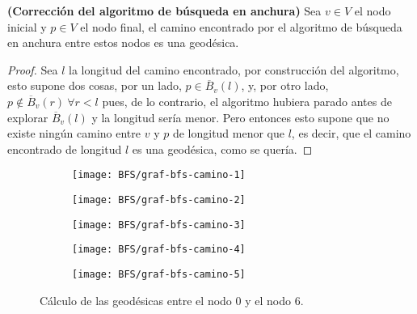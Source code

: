 \begin{proposicion}\label{prop:BFS}
	\textbf{(Corrección del algoritmo de búsqueda en anchura)} Sea $v \in V$ el nodo inicial y $p \in V$ el nodo final, el camino encontrado por el algoritmo de búsqueda en anchura entre estos nodos es una geodésica.
\end{proposicion}

\begin{proof}
	Sea $l$ la longitud del camino encontrado, por construcción del algoritmo, esto supone dos cosas, por un lado, $p \in \overline B_v(l)$, y, por otro lado, $p \notin \overline B_v(r)\ \forall r<l$ pues, de lo contrario, el algoritmo hubiera parado antes de explorar $\overline B_v(l)$ y la longitud sería menor. Pero entonces esto supone que no existe ningún camino entre $v$ y $p$ de longitud menor que $l$, es decir, que el camino encontrado de longitud $l$ es una geodésica, como se quería.
\end{proof}


\begin{figure}[htb]
	\centering
	\begin{subfigure}{0.25\linewidth}
		\texttt{[image: BFS/graf-bfs-camino-1]}
		\caption{}
	\end{subfigure}
	\begin{subfigure}{0.25\linewidth}
		\texttt{[image: BFS/graf-bfs-camino-2]}
		\caption{}
	\end{subfigure}
	\begin{subfigure}{0.25\linewidth}
		\texttt{[image: BFS/graf-bfs-camino-3]}
		\caption{}
	\end{subfigure}
	\begin{subfigure}{0.25\linewidth}
		\texttt{[image: BFS/graf-bfs-camino-4]}
		\caption{}
	\end{subfigure}
	\begin{subfigure}{0.25\linewidth}
		\texttt{[image: BFS/graf-bfs-camino-5]}
		\caption{}
	\end{subfigure}
	\caption{Cálculo de las geodésicas entre el nodo $0$ y el nodo $6$.}
	\label{fig:bfs-camino}
\end{figure}

